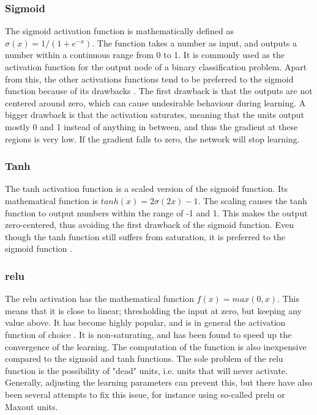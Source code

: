 \subsubsection{Sigmoid}

The sigmoid activation function is mathematically defined as $\sigma(x) = 1/(1 + e^{-x})$. The function takes a number as input, and outputs a number within a continuous range from 0 to 1. It is commonly used as the activation function for the output node of a binary classification problem. Apart from this, the other activations functions tend to be preferred to the sigmoid function because of its drawbacks \cite{cs231n-activation-functions}. The first drawback is that the outputs are not centered around zero, which can cause undesirable behaviour during learning. A bigger drawback is that the activation saturates, meaning that the units output mostly 0 and 1 instead of anything in between, and thus the gradient at these regions is very low. If the gradient falls to zero, the network will stop learning.

\subsubsection{Tanh}

The tanh activation function is a scaled version of the sigmoid function. Its mathematical function is $tanh(x) = 2\sigma(2x) - 1$. The scaling causes the tanh function to output numbers within the range of -1 and 1. This makes the output zero-centered, thus avoiding the first drawback of the sigmoid function. Even though the tanh function still suffers from saturation, it is preferred to the sigmoid function \cite{cs231n-activation-functions}.

\subsubsection{\acrshort{relu}}

The \acrfull{relu} \cite{relu} activation has the mathematical function $f(x) = max(0,x)$. This means that it is close to linear; thresholding the input at zero, but keeping any value above. It has become highly popular, and is in general the activation function of choice \cite{cs231n-activation-functions}. It is non-saturating, and has been found to speed up the convergence of the learning. The computation of the function is also inexpensive compared to the sigmoid and tanh functions. The sole problem of the \acrshort{relu} function is the possibility of "dead" units, i.e. units that will never activate. Generally, adjusting the learning parameters can prevent this, but there have also been several attempts to fix this issue, for instance using so-called \acrlong{prelu} \cite{prelu} or Maxout \cite{maxout} units.

